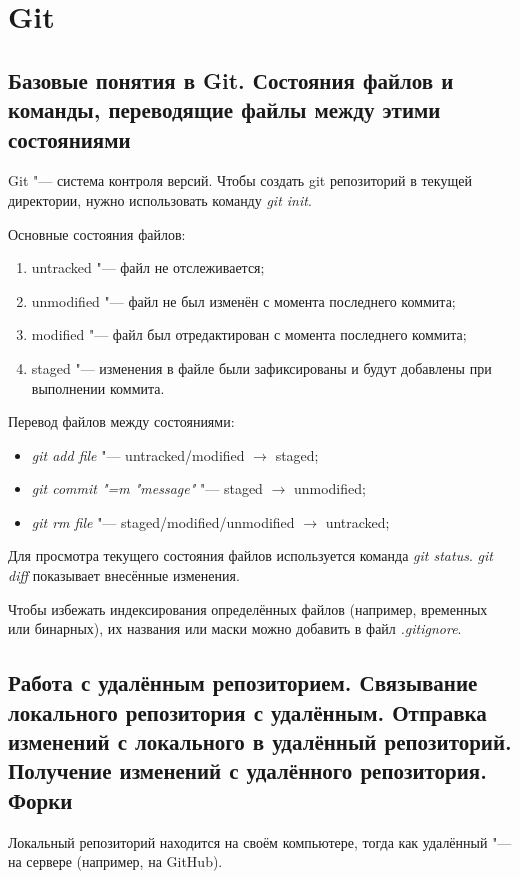\documentclass[12pt]{article}
\begin{document}
\section{Git}

\subsection{Базовые понятия в Git. Состояния файлов и команды, переводящие файлы между этими состояниями}
Git "--- система контроля версий. Чтобы создать git репозиторий в текущей директории, нужно использовать команду \textit{git init}.

Основные состояния файлов:
\begin{enumerate}
\item untracked "--- файл не отслеживается;
\item unmodified "--- файл не был изменён с момента последнего коммита;
\item modified "--- файл был отредактирован с момента последнего коммита;
\item staged "--- изменения в файле были зафиксированы и будут добавлены при выполнении коммита.
\end{enumerate}

Перевод файлов между состояниями:
\begin{itemize}
\item \textit{git add file} "--- untracked/modified $\rightarrow$ staged;
\item \textit{git commit "=m "message"} "--- staged $\rightarrow$ unmodified;
\item \textit{git rm file} "--- staged/modified/unmodified $\rightarrow$ untracked;
\end{itemize}

Для просмотра текущего состояния файлов используется команда \textit{git status}. \textit{git diff} показывает внесённые изменения.

Чтобы избежать индексирования определённых файлов (например, временных или бинарных), их названия или маски можно добавить в файл \textit{.gitignore}. 

\subsection{Работа с удалённым репозиторием. Связывание локального репозитория с удалённым. Отправка изменений с локального в удалённый репозиторий. Получение изменений с удалённого репозитория. Форки}

Локальный репозиторий находится на своём компьютере, тогда как удалённый "--- на сервере (например, на GitHub).
\end{document}
